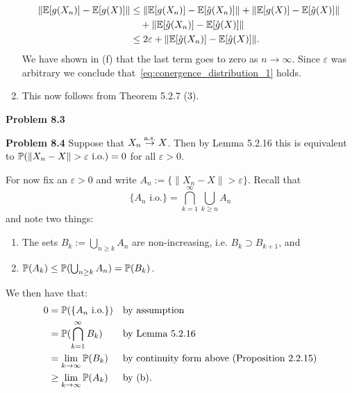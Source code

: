 \begin{enumerate}[label={(\alph*)}]
\begin{align*}
	\|\mathbb E[g(X_n)] - \mathbb E[g(X)]\| &\le \|\mathbb E[g(X_n)] - \mathbb E[\hat{g}(X_n)]\| 
		+ \|\mathbb E[g(X)] - \mathbb E[\hat{g}(X)]\| \\
	&\hspace{10pt}+ \|\mathbb E[\hat{g}(X_n)] - \mathbb E[\hat{g}(X)]\|\\
	&\le 2\varepsilon + \|\mathbb E[\hat{g}(X_n)] - \mathbb E[\hat{g}(X)]\|.
\end{align*}
We have shown in (f) that the last term goes to zero as $n \to \infty$. Since $\varepsilon$ was arbitrary we conclude that~\eqref{eq:conergence_distribution_1} holds.
\item This now follows from Theorem 5.2.7 (3).
\end{enumerate}

\bigskip

\textbf{Problem 8.3}

\bigskip

\textbf{Problem 8.4}
Suppose that $X_n \stackrel{\mathrm{a.s.}}{\rightarrow} X$. Then by Lemma 5.2.16 this is equivalent to $\mathbb P(\|X_n - X\| > \varepsilon \text{ i.o.}) = 0$ for all $\varepsilon > 0$. 

For now fix an $\varepsilon > 0$ and write $A_n := \{\|X_n - X\| > \varepsilon\}$. Recall that
\[
	\{A_n \text{ i.o.}\} = \bigcap_{k = 1}^\infty \bigcup_{k \ge n} A_n
\]
and note two things:
\begin{enumerate}[label={(\alph*)}]
\item The sets $B_k := \bigcup_{n \ge k} A_n$ are non-increasing, i.e. $B_k \supset B_{k+1}$, and
\item $\mathbb P(A_k) \le \mathbb P(\bigcup_{n \ge k} A_n) = \mathbb P(B_k)$.
\end{enumerate}
 
We then have that:
\begin{align*}
	0 &= \mathbb P(\{A_n \text{ i.o.}\}) &&\text{by assumption} \\
	&= \mathbb P(\bigcap_{k =1}^\infty B_k) &&\text{by Lemma 5.2.16}\\
	&= \lim_{k \to \infty} \mathbb P(B_k) &&\text{by continuity form above (Proposition 2.2.15)}\\
	&\ge \lim_{k \to \infty} \mathbb P(A_k) &&\text{by (b)}.
\end{align*}
